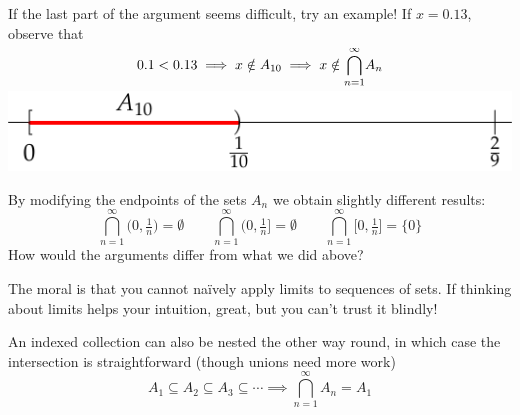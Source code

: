 \begin{example}{}{}
	If the last part of the argument seems difficult, try an example! If $x=0.13$, observe that\par
	\begin{minipage}[t]{0.6\linewidth}\vspace{-10pt}
		\[
			0.1<0.13 \implies x\notin A_{10} \implies x\notin\smash{\bigcap\limits_{n=1}^\infty} A_n
		\]
	\end{minipage}
	\hfill
	\begin{minipage}[t]{0.3\linewidth}\vspace{3pt}
		\hfill \includegraphics{setsii-06-intervalex}
	\end{minipage}
	\medbreak

	By modifying the endpoints of the sets $A_n$ we obtain slightly different results:
	\[
		\bigcap_{n=1}^\infty \bigl(0,\tfrac 1n) =\emptyset \qquad \bigcap_{n=1}^\infty \bigl(0,\tfrac 1n] =\emptyset\qquad \bigcap_{n=1}^\infty \bigl[0,\tfrac 1n] =\{0\}
	\]
	How would the arguments differ from what we did above?
\end{example}




The moral is that you cannot naïvely apply limits to sequences of sets. If thinking about limits helps your intuition, great, but you can't trust it blindly!\bigbreak

An indexed collection can also be nested the other way round, in which case the intersection is straightforward (though unions need more work)
\[
	A_1\subseteq A_2\subseteq A_3\subseteq\cdots \implies {\bigcap_{n=1}^\infty} A_n=A_1
\]

